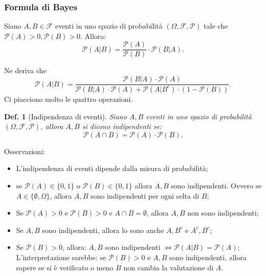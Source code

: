 \documentclass{article}
\newtheorem{definition}{Def.}[section]
\begin{document}
\subsubsection{Formula di Bayes}
Siano $A, B \in \mathcal{F}$ eventi in uno spazio di probabilità $(\Omega,
\mathcal{F}, \mathcal{P})$ tale che $\mathcal{P}(A) > 0, \mathcal{P}(B) > 0$.
Allora:
\begin{equation}
	\mathcal{P}(A | B) = \frac{\mathcal{P}(A)}{\mathcal{P}(B)} \cdot \mathcal{P}(B | A).
\end{equation}

Ne deriva che 
\begin{equation}
	\mathcal{P}(A | B) = \frac{\mathcal{P}(B | A) \cdot \mathcal{P}(A)}
	{\mathcal{P}(B | A) \cdot \mathcal{P}(A) + \mathcal{P}(A | B^c) \cdot
	( 1 - \mathcal{P}(B))}.
\end{equation}
Ci piacciono molto le quattro operazioni.

\begin{definition}[Indipendenza di eventi] Siano $A, B$ eventi in uno spazio di 
probabilità $(\Omega, \mathcal{F, P})$, allora $A, B$ si dicono indipendenti se:
\begin{equation}
	\mathcal{P}(A \cap B) = \mathcal{P}(A) \cdot \mathcal{P}(B).
\end{equation}
\end{definition}

Osservazioni:
\begin{itemize}
	\item L'indipendenza di eventi dipende dalla misura di probabilità;
	
	\item se $\mathcal{P}(A) \in \{0, 1\}$ o $\mathcal{P}(B) \in \{0, 1\}$
		allora $A, B$ sono indipendenti. Ovvero se $A \in \{\emptyset,
		\Omega\}$, allora $A, B$ sono indipendenti per ogni selta di $B$;

	\item Se $\mathcal{P}(A) > 0$ e $\mathcal{P}(B) > 0$ e $A \cap B =
		\emptyset$, allora $A, B$ non sono indipendenti;

	\item Se $A, B$ sono indipendenti, allora lo sono anche $A , B^c$ e $A^c ,
		B^c$;

	\item Se $\mathcal{P}(B) > 0$, allora:
		$A, B$ sono indipendenti $\iff \mathcal{P}(A | B) = \mathcal{P}(A)$;
		L'interpretazione sarebbe: se $\mathcal{P}(B) > 0$ e $A, B$ sono
		indipendenti, allora sapere se si è verificato o meno $B$ non cambia la
		valutazione di $A$.
\end{itemize}
\end{document}
